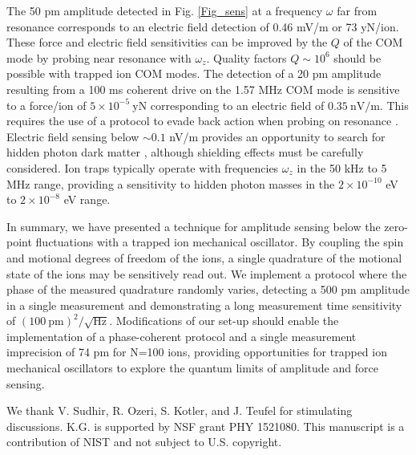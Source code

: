\documentclass[aps,prl,twocolumn,superscriptaddress,floatfix]{revtex4-1}
\begin{document}
The 50 pm amplitude detected in Fig. \ref{Fig_sens} at a frequency $\omega$ far from resonance corresponds to an electric field detection of 0.46 mV/m or 73 yN/ion. These force and electric field sensitivities can be improved by the $Q$ of the COM mode by probing near resonance with $\omega_z$. Quality factors $Q\sim 10^6$ should be possible with trapped ion COM modes. The detection of a 20 pm amplitude resulting from a 100 ms coherent drive on the 1.57 MHz COM mode is sensitive to a force/ion of $5\times10^{-5}\:\mathrm{yN}$ corresponding to an electric field of $0.35\:\mathrm{nV/m}$. This requires
the use of a protocol to evade back action when probing on resonance \citep{Hempel2013}. Electric field sensing below $\sim 0.1$ nV/m provides an opportunity to search for hidden photon dark matter \citep{Arias2012,Chaudhuri2015}, although shielding effects must be carefully considered. Ion traps typically operate with frequencies $\omega_z$ in the 50 kHz to 5 MHz range, providing a sensitivity to hidden photon masses in the $2 \times 10^{-10}$ eV to $2 \times 10^{-8}$ eV range.

In summary, we have presented a technique for amplitude sensing below the zero-point fluctuations with a trapped ion mechanical oscillator. By coupling
the spin and motional degrees of freedom of the ions, a single quadrature of the motional state of the ions may be sensitively read out. We implement a 
protocol where the phase of the measured quadrature randomly varies, detecting a 500 pm amplitude in a single measurement
and demonstrating a long measurement time sensitivity of $\left(100\:\mathrm{pm}\right)^{2}/\sqrt{\mathrm{Hz}}$. Modifications of our set-up should enable the implementation of a phase-coherent protocol and a single measurement
imprecision of 74 pm for N=100 ions, providing opportunities for
trapped ion mechanical oscillators to explore the quantum limits of amplitude and force sensing.

\begin{acknowledgments}
We thank V. Sudhir, R. Ozeri, S. Kotler, and J. Teufel for stimulating discussions. K.G. is supported by NSF grant PHY 1521080. This manuscript is a contribution of NIST and not subject to U.S. copyright.
\end{acknowledgments}



\end{document}
